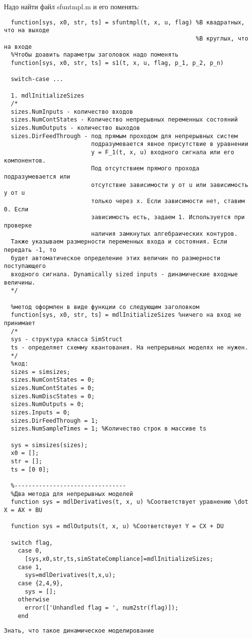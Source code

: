 Надо найти файл sfuntmpl.m и его поменять:
\begin{verbatim}
  function[sys, x0, str, ts] = sfuntmpl(t, x, u, flag) %В квадратных, что на выходе
                                                       %В круглых, что на входе
  %Чтобы доавить параметры заголовок надо поменять
  function[sys, x0, str, ts] = s1(t, x, u, flag, p_1, p_2, p_n) 

  switch-case ...

  1. mdlInitializeSizes
  /*
  sizes.NumInputs - количество входов
  sizes.NumContStates - Количество непрерывных переменных состояний
  sizes.NumOutputs - количество выходов
  sizes.DirFeedThrough - под прямым проходом для непрерывных систем
                         подразумевается явное присутствие в уравнении 
                         y = F_1(t, x, u) входного сигнала или его компонентов.
                         Под отсутствием прямого прохода подразумевается или
                         отсутствие зависимости y от u или зависимость y от u
                         только через x. Если зависимости нет, ставим 0. Если
                         зависимость есть, задаем 1. Используется при проверке
                         наличия замкнутых алгебраических контуров.
  Также указываем размерности переменных входа и состояния. Если передать -1, то
  будет автоматическое определение этих величин по размерности поступающего
  входного сигнала. Dynamically sized inputs - динамические входные величины.
  */
  
  %метод оформлен в виде функции со следующим заголовком
  function[sys, x0, str, ts] = mdlInitializeSizes %ничего на вход не принимает
  /*
  sys - структура класса SimStruct 
  ts - определяет схемму квантования. На непрерывных моделях не нужен.
  */
  %код:
  sizes = simsizes;
  sizes.NumContStates = 0;
  sizes.NumContStates = 0;
  sizes.NumDiscStates = 0;
  sizes.NumOutputs = 0;
  sizes.Inputs = 0;
  sizes.DirFeedThrough = 1;
  sizes.NumSampleTimes = 1; %Количество строк в массиве ts

  sys = simsizes(sizes);
  x0 = [];
  str = [];
  ts = [0 0];

  %--------------------------------
  %Два метода для непрерывных моделей
  function sys = mdlDerivatives(t, x, u) %Соответствует уравнению \dot X = AX + BU
  
  function sys = mdlOutputs(t, x, u) %Соответствует Y = CX + DU

  switch flag,
    case 0,
      [sys,x0,str,ts,simStateCompliance]=mdlInitializeSizes;
    case 1,
      sys=mdlDerivatives(t,x,u);
    case {2,4,9},
      sys = [];
    otherwise
      error(['Unhandled flag = ', num2str(flag)]);
    end
\end{verbatim}
\texttt{Знать, что такое динамическое моделирование}

